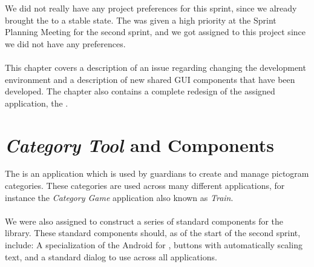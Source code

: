\FloatBarrier

We did not really have any project preferences for this sprint, since we already brought the \launcher to a stable state. The \giraf \ct was given a high priority at the Sprint Planning Meeting for the second sprint, and we got assigned to this project since we did not have any preferences. 
\\\\
This chapter covers a description of an issue regarding changing the development environment and a description of new shared GUI components that have been developed. The chapter also contains a complete redesign of the assigned application, the \ct.

\section{\emph{Category Tool} and Components}
\label{sec:category_tool_and_components}

The \giraf \ct is an application which is used by guardians to create and manage pictogram categories. These categories are used across many different applications, for instance the \emph{Category Game} application also known as \emph{Train}.
\\\\
We were also assigned to construct a series of standard components for the \gc library. These standard components should, as of the start of the second sprint, include: A specialization of the Android  for \giraf, buttons with automatically scaling text, and a standard dialog to use across all applications.





